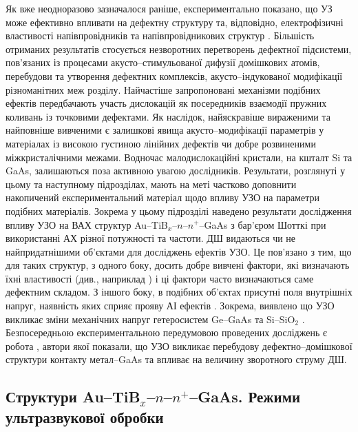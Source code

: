 Як вже неодноразово зазначалося раніше, експериментально показано, що УЗ може ефективно впливати на дефектну структуру та, відповідно, електрофізичні властивості напівпровідників та напівпровідникових структур \cite{Parchinskii2000r,Zaver,OlikhFTT,Parchinskii2003r,Ostrov2002FTPr,UST:SDErmol}.
Більшість отриманих результатів стосується незворотних перетворень  дефектної підсистеми, пов'язаних із процесами акусто--стимульованої дифузії домішкових атомів,  перебудови та утворення дефектних комплексів,  акусто--індукованої модифікації різноманітних меж розділу.
Найчастіше запропоновані механізми подібних ефектів передбачають участь дислокацій як посередників взаємодії пружних коливань із точковими дефектами.
Як наслідок, найяскравіше вираженими та найповніше вивченими є залишкові явища акусто--модифікації параметрів у матеріалах із високою густиною лінійних дефектів чи добре розвиненими міжкристалічними межами.
Водночас малодислокаційні кристали, на кшталт Si та GaAs, залишаються поза активною увагою дослідників.
Результати, розглянуті у цьому та наступному підрозділах, мають на меті частково доповнити
накопичений експериментальний матеріал щодо впливу УЗО на параметри подібних матеріалів.
Зокрема у цьому підрозділі наведено результати дослідження впливу УЗО
на ВАХ  структур Au--TiB$_x$--$n$--$n^+$--GaAs з бар’єром Шотткі при використанні АХ різної потужності та частоти.
ДШ видаються чи не найпридатнішими об’єктами для досліджень ефектів УЗО.
Це пов’язано з тим, що для таких структур, з одного боку, досить добре вивчені фактори, які визначають їхні властивості (див., наприклад \cite{Sze2012,Rhoderick1988,Singh1994,Evstropov2000,PipinsFTP})
і ці фактори часто визначаються саме дефектним складом.
З іншого боку, в подібних об’єктах присутні поля внутрішніх напруг, наявність яких сприяє прояву АІ ефектів \cite{Parchinskii2003r,Ostrov2002FTPr}.
Зокрема, виявлено що УЗО викликає зміни механічних напруг гетеросистем Ge--GaAs та Si--SiO$_2$ \cite{BritunFTT,Zdeb1989}.
Безпосередньою експериментальною передумовою проведених досліджень є робота \cite{UST:SDErmol},
автори якої показали, що УЗО викликає перебудову дефектно--домішкової структури контакту метал--GaAs та впливає на величину зворотного струму ДШ.


\subsection{Структури Au--TiB$_x$--$n$--$n^+$--GaAs. Режими ультразвукової обробки}


